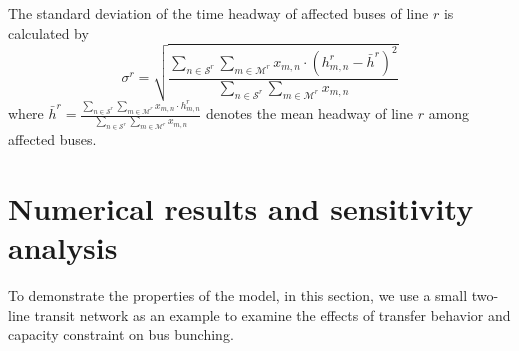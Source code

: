 \documentclass[smallextended]{svjour3}       %
\begin{document}
\begin{Abstract}
The standard deviation of the time headway of affected buses of line $r$ is calculated by 
\begin{equation}
    \sigma^{r} = \sqrt{\frac{\sum\limits_{n\in \mathcal{S}^{r}}\sum\limits_{m\in \mathcal{M}^{r}} x_{m,n}\cdot \left(h_{m,n}^{r}-\bar{h}^{r}\right)^{2}}
    {\sum\limits_{n\in \mathcal{S}^{r}}\sum\limits_{m\in \mathcal{M}^{r}} x_{m,n}}}
\end{equation}
where $\bar{h}^{r}=\frac{\sum\limits_{n\in \mathcal{S}^{r}}\sum\limits_{m\in \mathcal{M}^{r}} x_{m,n}\cdot h_{m,n}^{r}}
{\sum\limits_{n\in \mathcal{S}^{r}}\sum\limits_{m\in \mathcal{M}^{r}} x_{m,n}}$ 
denotes the mean headway of line $r$ among affected buses.

\section{Numerical results and sensitivity analysis}\label{example}
To demonstrate the properties of the model, in this section, we use a small two-line transit network as an example to examine the effects of transfer behavior and capacity constraint on bus bunching. 


\end{Abstract}
\end{document}
